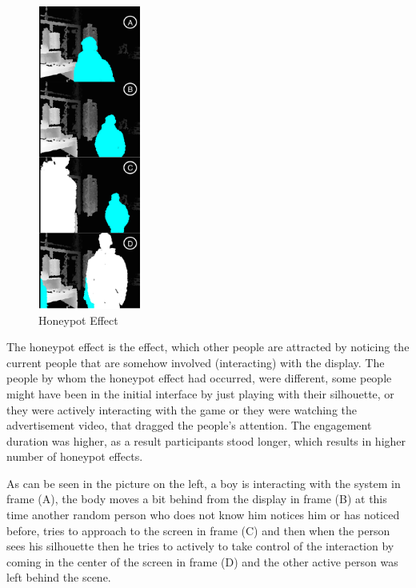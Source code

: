 \begin{figure}
  \vspace{-20pt}
  \begin{center}
    \includegraphics[width=0.3\textwidth,height=100mm]{figures/8/body_inter_findings/effects/honeypot}
  \end{center}
  \vspace{-20pt}
  \caption{Honeypot Effect}
  \vspace{-20pt}
\end{figure}
The honeypot effect is the effect, which other people are attracted by noticing the current people that are somehow involved (interacting) with the display. The people by whom the honeypot effect had occurred, were different, some people might have been in the initial interface by just playing with their silhouette, or they were actively interacting with the game or they were watching the advertisement video, that dragged the people’s attention. The engagement duration was higher, as a result participants stood longer, which results in higher number of honeypot effects.

As can be seen in the picture on the left, a boy is interacting with the system in frame (A), the body moves a bit behind from the display in frame (B) at this time another random person who does not know him notices him or has noticed before, tries to approach to the screen in frame (C) and then when the person sees his silhouette then he tries to actively to take control of the interaction by coming in the center of the screen in frame (D) and the other active person was left behind the scene.

